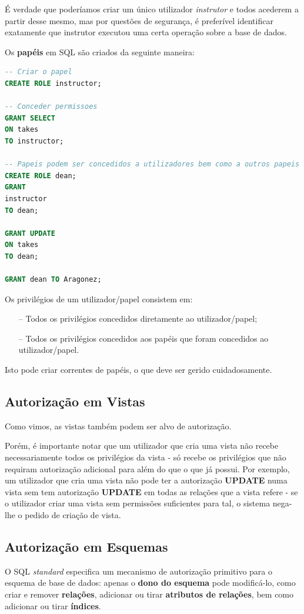 \documentclass[oneside]{book}
\theoremstyle{definition}
\begin{document}
É verdade que poderíamos criar um único utilizador \textit{instrutor} e todos acederem a partir desse mesmo, mas por questões de segurança, é preferível identificar exatamente que instrutor executou uma certa operação sobre a base de dados.

Os \textbf{papéis} em SQL são criados da seguinte maneira:
\begin{lstlisting}[language=SQL, morekeywords={TO}, framesep=8pt, xleftmargin=40pt, framexleftmargin=40pt, frame=tb, framerule=0pt]
-- Criar o papel
CREATE ROLE instructor;

-- Conceder permissoes
GRANT SELECT
ON takes
TO instructor;

-- Papeis podem ser concedidos a utilizadores bem como a outros papeis
CREATE ROLE dean;
GRANT 
instructor 
TO dean;

GRANT UPDATE
ON takes 
TO dean;

GRANT dean TO Aragonez;
\end{lstlisting}

Os privilégios de um utilizador/papel consistem em:
\begin{itemize}
    \itemsep0cm
    \item[--] Todos os privilégios concedidos diretamente ao utilizador/papel;
    \item[--] Todos os privilégios concedidos aos papéis que foram concedidos ao utilizador/papel.
\end{itemize}
Isto pode criar correntes de papéis, o que deve ser gerido cuidadosamente.

\subsection{Autorização em Vistas}
Como vimos, as vistas também podem ser alvo de autorização.

Porém, é importante notar que um utilizador que cria uma vista não recebe necessariamente todos os privilégios da vista - só recebe os privilégios que não requiram autorização adicional para além do que o que já possui. Por exemplo, um utilizador que cria uma vista não pode ter a autorização \textbf{UPDATE} numa vista sem tem autorização \textbf{UPDATE} em todas as relações que a vista refere - se o utilizador criar uma vista sem permissões suficientes para tal, o sistema nega-lhe o pedido de criação de vista.

\subsection{Autorização em Esquemas}
O SQL \textit{standard} especifica um mecanismo de autorização primitivo para o esquema de base de dados: apenas o \textbf{dono do esquema} pode modificá-lo, como criar e remover \textbf{relações}, adicionar ou tirar \textbf{atributos de relações}, bem como adicionar ou tirar \textbf{índices}.
\end{document}
